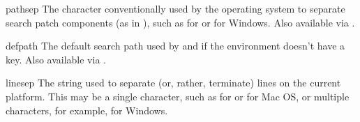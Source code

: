 \begin{datadesc}{pathsep}
The character conventionally used by the operating system to separate
search patch components (as in ), such as \character{:} for
\POSIX{} or \character{;} for Windows.
Also available via .
\end{datadesc}

\begin{datadesc}{defpath}
The default search path used by  and
 if the environment doesn't have a 
key.
Also available via .
\end{datadesc}

\begin{datadesc}{linesep}
The string used to separate (or, rather, terminate) lines on the
current platform.  This may be a single character, such as  for \POSIX{} or  for Mac OS, or multiple characters,
for example,  for Windows.
\end{datadesc}

